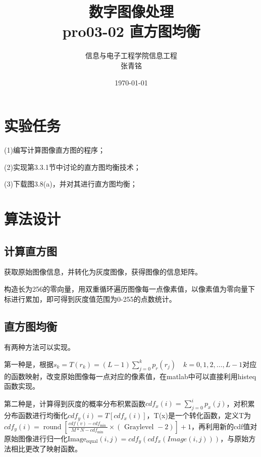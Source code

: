 \documentclass{article}
\title{{\Huge{\textbf{数字图像处理}}}\\pro03-02 直方图均衡}
\author{信息与电子工程学院\quad 信息工程 \quad 3200105426\\张青铭}
\date{\today}
\begin{document}
	\maketitle
	\section{实验任务}
	(1)编写计算图像直方图的程序；
	
	(2)实现第3.3.1节中讨论的直方图均衡技术；
	
	(3)下载图3.8(a)，并对其进行直方图均衡；
	\section{算法设计}
	\subsection{计算直方图}
	获取原始图像信息，并转化为灰度图像，获得图像的信息矩阵。
	
	构造长为256的零向量，用双重循环遍历图像每一点像素值，以像素值为零向量下标进行累加，即可得到灰度值范围为0-255的点数统计。
	\subsection{直方图均衡}
	有两种方法可以实现。
	
	第一种是，根据$s_k=T(r_k)=(L-1)\sum\limits_{j=0}^k p_r(r_j)\quad k=0,1,2,\ldots,L-1$对应的函数映射，改变原始图像每一点对应的像素值，在matlab中可以直接利用histeq函数实现。
	
	第二种是，计算得到灰度的概率分布积累函数$cdf_{x}(i)=\sum_{j=0}^{i}p_{x}(j)$，对积累分布函数进行均衡化$cdf_{y}(i)=T[cdf_{x}(i)]$，T(x)是一个转化函数，定义T为$cdf_y(i)=\operatorname{round}\left[\frac{c d f(v)-c d f _ \text {min }}{M * N-c d f_ \text {min }} \times(\text { Graylevel }-2)\right]+1$，再利用新的cdf值对原始图像进行归一化$\operatorname{Image_{equal}}(i, j)=cdf_y(cdf_x(Image(i,j)))$，与原始方法相比更改了映射函数。
\end{document}
